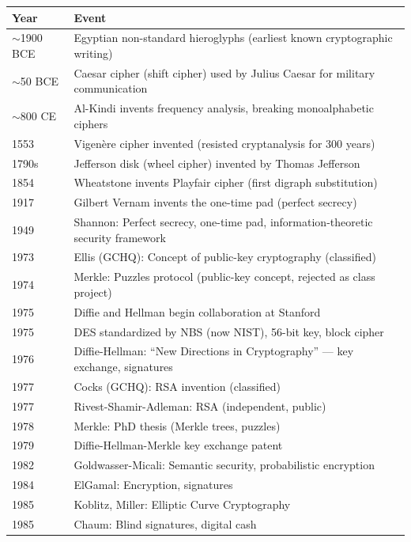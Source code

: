 \begin{tabularx}{\linewidth}{|l|X|}
\hline
\textbf{Year} & \textbf{Event} \\ \hline
$\sim$1900 BCE & Egyptian non-standard hieroglyphs (earliest known cryptographic writing) \\ \hline
$\sim$50 BCE & Caesar cipher (shift cipher) used by Julius Caesar for military communication \\ \hline
$\sim$800 CE & Al-Kindi invents frequency analysis, breaking monoalphabetic ciphers \\ \hline
1553 & Vigenère cipher invented (resisted cryptanalysis for 300 years) \\ \hline
1790s & Jefferson disk (wheel cipher) invented by Thomas Jefferson \\ \hline
1854 & Wheatstone invents Playfair cipher (first digraph substitution) \\ \hline
1917 & Gilbert Vernam invents the one-time pad (perfect secrecy) \\ \hline
1949 & Shannon: Perfect secrecy, one-time pad, information-theoretic security framework \\ \hline
1973 & Ellis (GCHQ): Concept of public-key cryptography (classified) \\ \hline
1974 & Merkle: Puzzles protocol (public-key concept, rejected as class project) \\ \hline
1975 & Diffie and Hellman begin collaboration at Stanford \\ \hline
1975 & DES standardized by NBS (now NIST), 56-bit key, block cipher \\ \hline
1976 & Diffie-Hellman: ``New Directions in Cryptography'' — key exchange, signatures \\ \hline
1977 & Cocks (GCHQ): RSA invention (classified) \\ \hline
1977 & Rivest-Shamir-Adleman: RSA (independent, public) \\ \hline
1978 & Merkle: PhD thesis (Merkle trees, puzzles) \\ \hline
1979 & Diffie-Hellman-Merkle key exchange patent \\ \hline
1982 & Goldwasser-Micali: Semantic security, probabilistic encryption \\ \hline
1984 & ElGamal: Encryption, signatures \\ \hline
1985 & Koblitz, Miller: Elliptic Curve Cryptography \\ \hline
1985 & Chaum: Blind signatures, digital cash \\ \hline

\end{tabularx}
